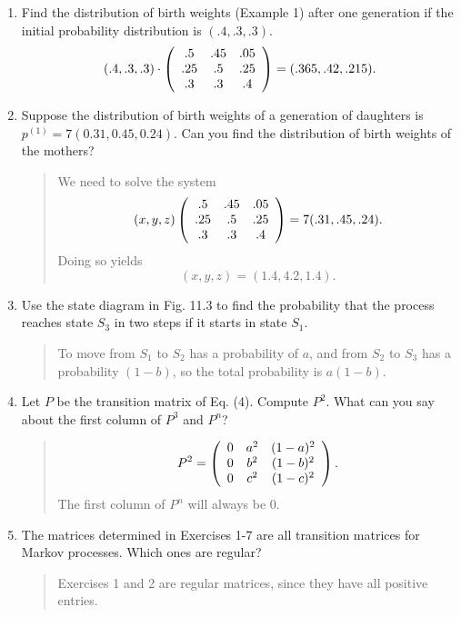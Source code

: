 \documentclass{hw}
\begin{document}
\begin{enumerate}
\item Find the distribution of birth weights (Example 1) after one generation if the initial
probability distribution is $(.4, .3, .3)$.
\[
(.4,.3,.3)\cdot
\left(
\begin{array}{c c c}
.5 & .45 & .05\\
.25 & .5 & .25\\
.3 & .3 & .4
\end{array}
\right)
= (.365,.42,.215).
\]

\item Suppose the distribution of birth weights of a generation of daughters is
$p^{(1)}=7(0.31,0.45,0.24)$. Can you find the distribution of birth weights of the mothers?
\begin{quote}
We need to solve the system
\[
(x,y,z)
\left(
\begin{array}{c c c}
.5 & .45 & .05\\
.25 & .5 & .25\\
.3 & .3 & .4
\end{array}
\right)
= 7(.31,.45,.24).
\]
Doing so yields
\[
(x,y,z)=(1.4,4.2,1.4).
\]
\end{quote}

\item Use the state diagram in Fig. 11.3 to find the probability that the process reaches state
$S_{3}$ in two steps if it starts in state $S_{1}$.
\begin{quote}
To move from $S_{1}$ to $S_{2}$ has a probability of $a$, and from $S_{2}$ to $S_{3}$ has a
probability $(1-b)$, so the total probability is $a(1-b)$.
\end{quote}

\item Let $P$ be the transition matrix of Eq. (4). Compute $P^{2}$. What can you say about the
first column of $P^{3}$ and $P^{n}$?
\begin{quote}
\[
P^{2}=
\left(
\begin{array}{c c c}
0 & a^2 & (1-a)^2\\
0 & b^2 & (1-b)^2\\
0 & c^2 & (1-c)^2
\end{array}
\right).
\]
The first column of $P^{n}$ will always be 0.
\end{quote}

\setcounter{enumi}{20}
\item The matrices determined in Exercises 1-7 are all transition matrices for Markov processes.
Which ones are regular?
\begin{quote}
Exercises 1 and 2 are regular matrices, since they have all positive entries.
\end{quote}


\end{enumerate}
\end{document}
